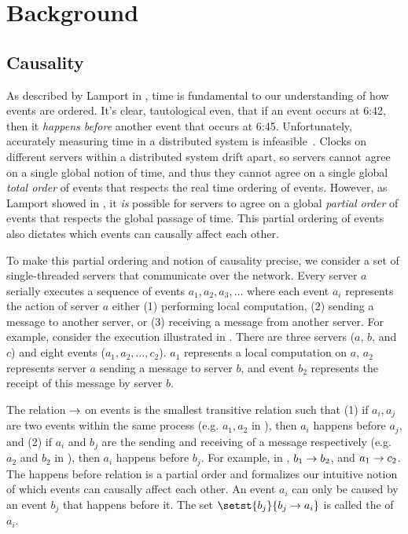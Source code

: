 \newcommand{\ttt}[1]{\texttt{#1}}

\section{Background}

\subsection{Causality}
As described by Lamport in \cite{lamport1978time}, time is fundamental to our
understanding of how events are ordered. It's clear, tautological even, that if
an event occurs at 6:42, then it \emph{happens before} another event that
occurs at 6:45. Unfortunately, accurately measuring time in a distributed
system is infeasible~\cite{marzullo1984maintaining, sampath2012synchronization,
schmid2000orthogonal}. Clocks on different servers within a distributed system
drift apart, so servers cannot agree on a single global notion of time, and
thus they cannot agree on a single global \emph{total order} of events that
respects the real time ordering of events. However, as Lamport showed in
\cite{lamport1978time}, it \emph{is} possible for servers to agree on a global
\emph{partial order} of events that respects the global passage of time. This
partial ordering of events also dictates which events can causally affect each
other.

To make this partial ordering and notion of causality precise, we consider a
set of single-threaded servers that communicate over the network. Every server
$a$ serially executes a sequence of events $a_1, a_2, a_3, \ldots$ where each
event $a_i$ represents the action of server $a$ either (1) performing local
computation, (2) sending a message to another server, or (3) receiving a
message from another server. For example, consider the execution illustrated in
. There are three servers ($a$, $b$, and $c$) and eight
events ($a_1, a_2, \ldots, c_2$).  $a_1$ represents a local computation on $a$,
$a_2$ represents server $a$ sending a message to server $b$, and event $b_2$
represents the receipt of this message by server $b$.

{}

The  relation $\to$ on events is the
smallest transitive relation such that
%
(1)
  if $a_i, a_j$ are two events within the same process (e.g. $a_1, a_2$ in
  ), then $a_i$ happens before $a_j$, and
(2)
  if $a_i$ and $b_j$ are the sending and receiving of a message respectively
  (e.g. $a_2$ and $b_2$ in ), then $a_i$ happens before
  $b_j$.
%
For example, in , $b_1 \to b_2$, and $a_1
\to c_2$. The happens before relation is a partial order and
formalizes our intuitive notion of which events can causally affect each other.
An event $a_i$ can only be caused by an event $b_j$ that happens before it.
The set $\setst{b_j}{b_j \happensbefore a_i}$ is called the  of $a_i$.

